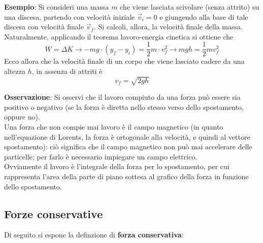 \documentclass[a4paper]{extarticle}
\begin{document}
\vspace{1em}
\noindent
\textbf{Esempio}: Si consideri una massa $m$ che viene lasciata scivolare (senza attrito) su una discesa, partendo con velocità iniziale $\vec v_i = 0$ e giungendo alla base di tale discesa con velocità finale $\vec v_f$. Si calcoli, allora, la velocità finale della massa.\\
Naturalmente, applicando il teorema lavoro-energia cinetica si ottiene che
\[W=\Delta K \longrightarrow -mg \cdot (y_f - y_i) = \frac{1}{2}m \cdot v_f^2 \longrightarrow mgh = \frac{1}{2} m v_f^2\]
Ecco allora che la velocità finale di un corpo che viene lasciato cadere da una altezza $h$, in assenza di attriti è
\[\boxed{v_f=\sqrt{2gh}}\]

\vspace{1em}
\noindent
\textbf{Osservazione}: Si osservi che il lavoro compiuto da una forza può essere sia positivo o negativo (se la forza è diretta nello stesso verso dello spostamento, oppure no).\\
Una forza che non compie mai lavoro è il campo magnetico (in quanto nell'equazione di Lorents, la forza è ortogonale alla velocità, e quindi al vettore spostamento): ciò significa che il campo magnetico non può mai accelerare delle particelle; per farlo è necessario impiegare un campo elettrico.\\
Ovviamente il lavoro è l'integrale della forza per lo spostamento, per cui rappresenta l'area della parte di piano sottesa al grafico della forza in funzione dello spostamento.

\vspace{1em}
\subsection{Forze conservative}
Di seguito si espone la definzione di \textbf{forza conservativa}:
\end{document}
